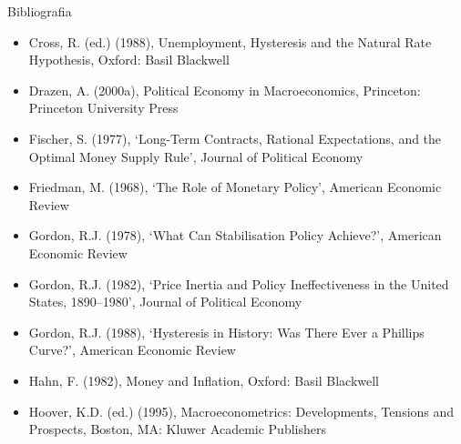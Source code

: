 \documentclass[10pt]{beamer}
\begin{document}
\begin{frame}{ Bibliografia}
    \begin{itemize}                        
        \item Cross, R. (ed.) (1988), Unemployment, Hysteresis and the Natural Rate Hypothesis, Oxford: Basil Blackwell\medskip        
        \item Drazen, A. (2000a), Political Economy in Macroeconomics, Princeton: Princeton University Press\medskip
        \item Fischer, S. (1977), ‘Long-Term Contracts, Rational Expectations, and the Optimal Money Supply Rule’, Journal of Political Economy\medskip
        \item Friedman, M. (1968), ‘The Role of Monetary Policy’, American Economic Review\medskip        
        \item Gordon, R.J. (1978), ‘What Can Stabilisation Policy Achieve?’, American Economic Review\medskip
        \item Gordon, R.J. (1982), ‘Price Inertia and Policy Ineffectiveness in the United States, 1890–1980’, Journal of Political Economy\medskip
        \item Gordon, R.J. (1988), ‘Hysteresis in History: Was There Ever a Phillips Curve?’, American Economic Review\medskip
        \item Hahn, F. (1982), Money and Inflation, Oxford: Basil Blackwell\medskip
        \item Hoover, K.D. (ed.) (1995), Macroeconometrics: Developments, Tensions and Prospects, Boston, MA: Kluwer Academic Publishers\medskip        
    \end{itemize}
\end{frame}
\end{document}
